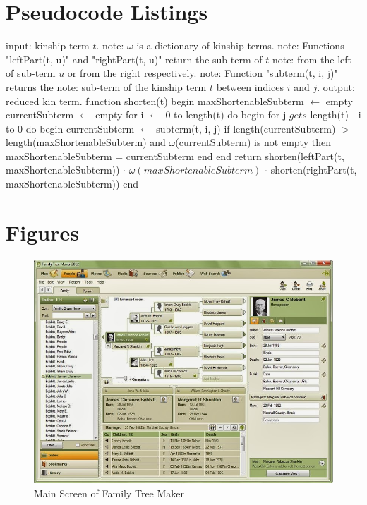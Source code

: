 \appendix
\chapter{Pseudocode Listings}
\begin{algorithm}[caption={Kinship Term Reduction}, label={algo:red}]
    input: kinship term $t$.
    note: $\omega$ is a dictionary of kinship terms.
    note: Functions "leftPart(t, u)" and "rightPart(t, u)" return the sub-term of $t$
    note: from the left of sub-term $u$ or from the right respectively.
    note: Function "subterm(t, i, j)" returns the
    note: sub-term of the kinship term $t$ between indices $i$ and $j$.
    output: reduced kin term.
    function shorten(t)
    begin
        maxShortenableSubterm $\gets$ empty
        currentSubterm $\gets$ empty
        for i $\gets$ 0 to length(t) do
        begin
            for j $gets$ length(t) - i to 0 do
            begin
                currentSubterm $\gets$ subterm(t, i, j)
                if length(currentSubterm) $>$ length(maxShortenableSubterm)
                    and $\omega$(currentSubterm) is not empty
                then
                    maxShortenableSubterm = currentSubterm
            end
        end
        return shorten(leftPart(t, maxShortenableSubterm))
               $\cdot$ $\omega(maxShortenableSubterm)$
               $\cdot$ shorten(rightPart(t, maxShortenableSubterm))
    end
\end{algorithm}

\chapter{Figures}

\begin{figure}
    \centering
    \includegraphics[width=\linewidth]{figs/ftmShot.png}
    \caption{Main Screen of Family Tree Maker}
    \label{fig:ftmShot}
\end{figure}

